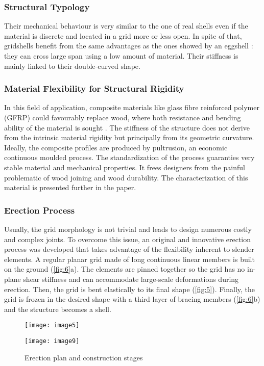 \subsubsection{Structural Typology}
Their mechanical behaviour is very similar to the one of real shells even if the material is discrete and located in a grid more or less open. In spite of that, gridshells benefit from the same advantages as the ones showed by an eggshell : they can cross large span using a low amount of material. Their stiffness is mainly linked to their double-curved shape.


\subsubsection{Material Flexibility for Structural Rigidity}
In this field of application, composite materials like glass fibre reinforced polymer (GFRP) could favourably replace wood, where both resistance and bending ability of the material is sought \cite{Douthe2010}. The stiffness of the structure does not derive from the intrinsic material rigidity but principally from its geometric curvature. Ideally, the composite profiles are produced by pultrusion, an economic continuous moulded process. The standardization of the process guaranties very stable material and mechanical properties. It frees designers from the painful problematic of wood joining and wood durability. The characterization of this material is presented further in the paper.


\subsubsection{Erection Process}
Usually, the grid morphology is not trivial and leads to design numerous costly and complex joints. To overcome this issue, an original and innovative erection process was developed that takes advantage of the flexibility inherent to slender elements. A regular planar grid made of long continuous linear members is built on the ground (\autoref{fig:6}a). The elements are pinned together so the grid has no in-plane shear stiffness and can accommodate large-scale deformations during erection. Then, the grid is bent elastically to its final shape (\autoref{fig:5}). Finally, the grid is frozen in the desired shape with a third layer of bracing members (\autoref{fig:6}b) and the structure becomes a shell.
\begin{figure}[t]
	\begin{minipage}[b]{.70\linewidth}
		\centering\texttt{[image: image5]}
	\end{minipage} \hfill
	\begin{minipage}[b]{.25\linewidth}
		\centering\texttt{[image: image9]}	
	\end{minipage}
	\vspace{0.5cm}
	\caption{Erection plan and construction stages}\label{fig:6}
\end{figure}

%
%

